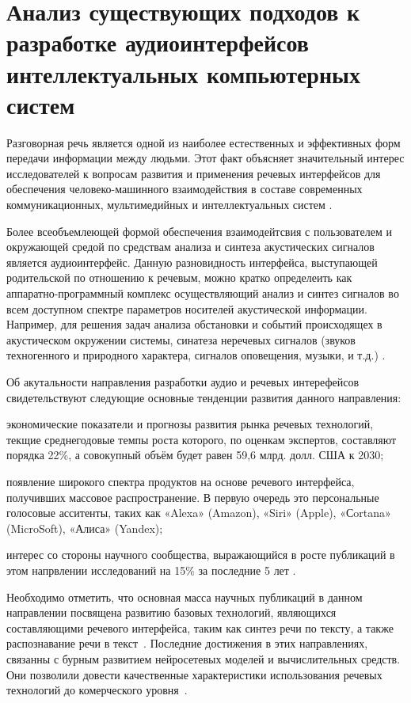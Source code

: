 \section{Анализ существующих подходов к разработке аудиоинтерфейсов интеллектуальных компьютерных систем}

Разговорная речь является одной из наиболее естественных и эффективных форм передачи информации между людьми. Этот факт объясняет значительный интерес исследователей к вопросам развития и применения речевых интерфейсов для обеспечения человеко-машинного взаимодействия в составе современных коммуникационных, мультимедийных и интеллектуальных систем .

Более всеобъемлеющей формой обеспечения взаимодейтсвия с пользователем и окружающей средой по средствам анализа и синтеза акустических сигналов является аудиоинтерфейс. Данную разновидность интерфейса, выступающей родительской по отношению к речевым, можно кратко определеить как аппаратно-программный комплекс осуществляющий анализ и синтез сигналов во всем доступном спектре параметров носителей акустической информации. Например, для решения задач анализа обстановки и событий происходящех в акустическом окружении системы, синатеза неречевых сигналов (звуков техногенного и природного характера, сигналов оповещения, музыки, и т.д.) .

Об акутальности направления разработки аудио и речевых интерефейсов свидетельствуют следующие основные тенденции развития данного направления:
\begin{textitemize}    
    \item экономические показатели и прогнозы развития рынка речевых технологий, текщие среднегодовые темпы роста которого, по оценкам экспертов, составляют порядка 22\%, а совокупный объём будет равен 59,6 млрд. долл. США к 2030;
    \item появление широкого спектра продуктов на основе речевого интерфейса, получивших массовое распространение. В первую очередь это персональные голосовые асситенты, таких как  «Alexa» (Amazon), «Siri» (Apple), «Сortana» (MicroSoft), «Алиса» (Yandex);
    \item интерес со стороны научного сообщества, выражающийся в росте публикаций в этом напрвлении исследований на 15\% за последние 5 лет .
\end{textitemize}

Необходимо отметить, что основная масса научных публикаций в данном направлении посвящена развитию базовых технологий, являющихся составляющими речевого интерфейса, таким как синтез речи по тексту, а также распознавание речи в текст~. Последние достижения в этих направлениях, связанны с бурным развитием нейросетевых моделей и вычислительных средств. Они позволили довести качественные характеристики использования речевых технологий до комерческого уровня~.

